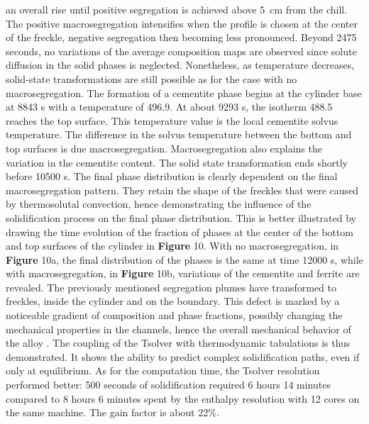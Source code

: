 an overall rise until positive segregation is achieved above \SI{5}{\centi\metre} from the chill. The positive macrosegregation 
intensifies when the profile is chosen at the center of the freckle, negative segregation then becoming less pronounced.
%
Beyond \num{2475} seconds, no variations of the average composition maps are observed since solute diffusion 
in the solid phases is neglected. Nonetheless, as temperature decreases, solid-state transformations are 
still possible as for the case with no macrosegregation. The formation of a cementite phase begins at the 
cylinder base at \num{8843} s with a temperature of \SI{496.9}{\udegC}. At about \num{9293} s, the isotherm \SI{488.5}{\udegC} reaches the 
top surface. This temperature value is the local cementite solvus temperature. The difference in the solvus 
temperature between the bottom and top surfaces is due macrosegregation. Macrosegregation also explains the 
variation in the cementite content. The solid state transformation ends shortly before \num{10500} s. The final phase 
distribution is clearly dependent on the final macrosegregation pattern. They retain the shape of the freckles 
that were caused by thermosolutal convection, hence demonstrating the influence of the solidification process on 
the final phase distribution. This is better illustrated by drawing the time evolution of the fraction of 
phases at the center of the bottom and top surfaces of the cylinder in \textbf{Figure} 10. With no macrosegregation, in 
\textbf{Figure} 10a, the final distribution of the phases is the same at time \num{12000} s, while with macrosegregation, 
in \textbf{Figure} 10b, variations of the cementite and ferrite are revealed. 
The previously mentioned segregation plumes have transformed to freckles, inside the cylinder and on the boundary. 
This defect is marked by a noticeable gradient of composition and phase fractions, possibly changing the mechanical 
properties in the channels, hence the overall mechanical behavior of the alloy \citep{copley_origin_1970}. The coupling of the Tsolver with 
thermodynamic tabulations is thus demonstrated. It shows the ability to predict complex solidification paths, even if 
only at equilibrium. As for the computation time, the Tsolver resolution performed better: 500 seconds of solidification 
required 6 hours 14 minutes compared to 8 hours 6 minutes spent by the enthalpy resolution with 12 cores on the same machine. 
The gain factor is about 22\%.
%
